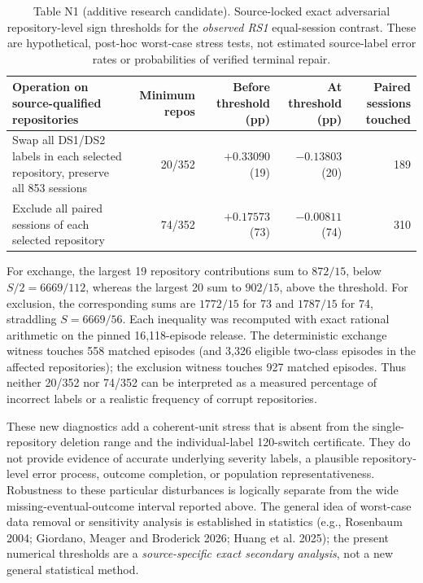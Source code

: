 \begin{table}[htbp]
\centering
\caption*{Table N1 (additive research candidate). Source-locked exact adversarial repository-level sign thresholds
for the \emph{observed RS1} equal-session contrast. These are hypothetical,
post-hoc worst-case stress tests, not estimated source-label error rates or
probabilities of verified terminal repair.}
\small
\begin{tabularx}{\textwidth}{@{}Xrrrr@{}}
\toprule
Operation on source-qualified repositories &
Minimum repos & Before threshold (pp) & At threshold (pp) &
Paired sessions touched \\
\midrule
Swap all DS1/DS2 labels in each selected repository,
preserve all 853 sessions & 20/352 & $+0.33090$ (19) &
$-0.13803$ (20) & 189 \\
Exclude all paired sessions of each selected repository &
74/352 & $+0.17573$ (73) &
$-0.00811$ (74) & 310 \\
\bottomrule
\end{tabularx}
\end{table}

For exchange, the largest 19 repository contributions sum to $872/15$,
below $S/2=6669/112$, whereas the largest 20 sum to $902/15$, above the
threshold. For exclusion, the corresponding sums are $1772/15$ for 73 and
$1787/15$ for 74, straddling $S=6669/56$. Each inequality was recomputed
with exact rational arithmetic on the pinned 16,118-episode release. The
deterministic exchange witness touches 558 matched episodes (and 3,326
eligible two-class episodes in the affected repositories); the exclusion
witness touches 927 matched episodes. Thus neither 20/352 nor 74/352 can
be interpreted as a measured percentage of incorrect labels or a realistic
frequency of corrupt repositories.

These new diagnostics add a coherent-unit stress that is absent from the
single-repository deletion range and the individual-label 120-switch
certificate. They do not provide evidence of accurate underlying severity
labels, a plausible repository-level error process, outcome completion, or
population representativeness. Robustness to these particular disturbances
is logically separate from the wide missing-eventual-outcome interval
reported above. The general idea of worst-case data removal or sensitivity
analysis is established in statistics (e.g., Rosenbaum 2004; Giordano,
Meager and Broderick 2026; Huang et al. 2025); the present numerical
thresholds are a \emph{source-specific exact secondary analysis}, not a
new general statistical method.

